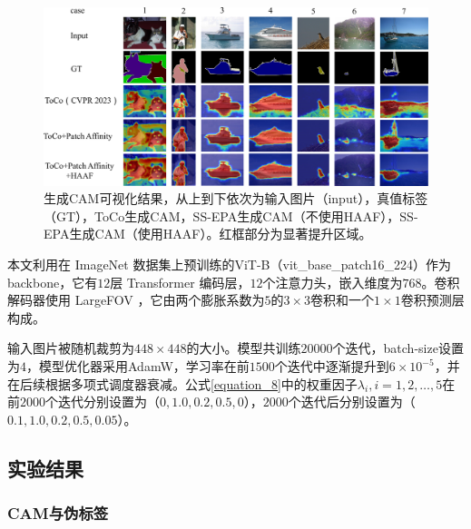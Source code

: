 \begin{figure}[t]
    \centerline{\includegraphics[width=6in]{fig/fig5.pdf}}
    \begin{CJK*}{UTF8}{fs}
        \caption{生成CAM可视化结果，从上到下依次为输入图片（input），真值标签（GT），ToCo生成CAM，SS-EPA生成CAM（不使用HAAF），SS-EPA生成CAM（使用HAAF）。红框部分为显著提升区域。}\label{fig5}
    \end{CJK*}
\end{figure}

本文利用在 ImageNet 数据集\cite{19deng2009imagenet}上预训练的ViT-B（vit\_base\_patch16\_224）\cite{02dosovitskiy2020image}作为 backbone，它有$12$层 Transformer 编码层，$12$个注意力头，嵌入维度为$768$。卷积解码器使用 LargeFOV \cite{20chen2017deeplab}，它由两个膨胀系数为$5$的$3\times 3$卷积和一个$1\times 1$卷积预测层构成。

输入图片被随机裁剪为$448\times 448$的大小。模型共训练$20000$个迭代，batch-size设置为$4$，模型优化器采用AdamW\cite{21loshchilov2017decoupled}，学习率在前$1500$个迭代中逐渐提升到$6\times 10^{-5}$，并在后续根据多项式调度器衰减。公式\ref{equation_8}中的权重因子$\lambda_i,i=1,2,…,5$在前$2000$个迭代分别设置为（$0, 1.0, 0.2, 0.5, 0$），$2000$个迭代后分别设置为（$0.1, 1.0, 0.2, 0.5, 0.05$）。

\vspace{2mm}

\begin{CJK*}{UTF8}{zhhei}
    \subsection{实验结果}
\end{CJK*}
\begin{CJK*}{UTF8}{zhhei}
    \subsubsection{CAM与伪标签}
\end{CJK*}

